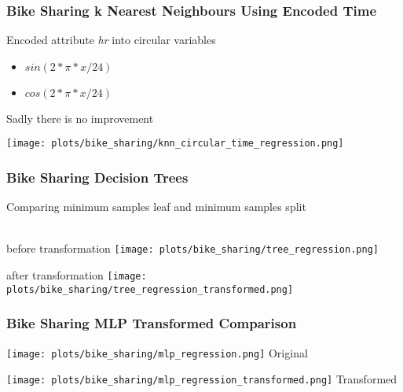 \documentclass[aspectratio=169]{beamer}
\begin{document}
\begin{frame}{}
\frametitle{Bike Sharing k Nearest Neighbours Using Encoded Time}
\begin{minipage}{0.3\textwidth}
Encoded attribute \textit{hr} into circular variables\
\begin{itemize}
\item $sin(2*\pi*x/24)$
\item $cos(2*\pi*x/24)$
\end{itemize}
Sadly there is no improvement
\end{minipage}
\begin{minipage}{0.69\textwidth}
  \texttt{[image: plots/bike\_sharing/knn\_circular\_time\_regression.png]}
\end{minipage}
 
\end{frame}


\begin{frame}{}
\frametitle{Bike Sharing Decision Trees }
Comparing minimum samples leaf and minimum samples split\\~\\
\begin{minipage}{0.49\textwidth}
	\center before transformation
    \texttt{[image: plots/bike\_sharing/tree\_regression.png]}
\end{minipage}
\begin{minipage}{0.49\textwidth}
	\center after transformation
    \texttt{[image: plots/bike\_sharing/tree\_regression\_transformed.png]}
\end{minipage}
\end{frame}

\begin{frame}{}
\frametitle{Bike Sharing MLP Transformed Comparison}

\begin{minipage}{0.49\textwidth}
    \texttt{[image: plots/bike\_sharing/mlp\_regression.png]}
    \center Original
\end{minipage}
\begin{minipage}{0.49\textwidth}
    \texttt{[image: plots/bike\_sharing/mlp\_regression\_transformed.png]}
    \center Transformed
\end{minipage}
\end{frame}
\end{document}
